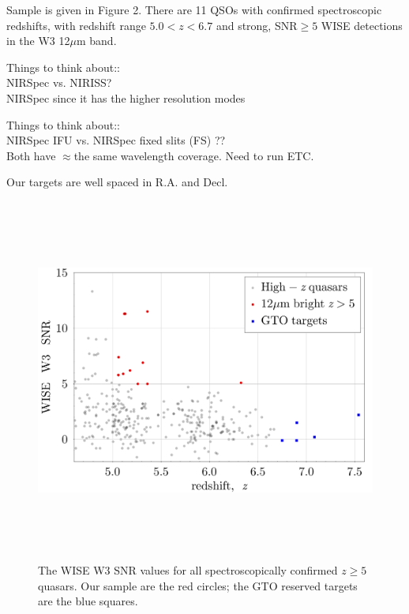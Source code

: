 \smallskip
\smallskip
\noindent
Sample is given in Figure 2. There are 
11 QSOs with confirmed spectroscopic redshifts, with redshift range $5.0<z<6.7$ and
strong, SNR$\geq 5$ WISE detections in the W3 12$\mu$m band.

\smallskip
\smallskip
\noindent
Things to think about::\\
NIRSpec vs. NIRISS?\\
NIRSpec since it has the higher resolution modes

\smallskip
\smallskip
\noindent
Things to think about::\\
NIRSpec IFU vs.  NIRSpec fixed slits (FS) ?? \\
Both have $\approx$the same wavelength coverage. Need to run ETC. 


\smallskip
\smallskip
\noindent
Our targets are well spaced in R.A. and Decl.


\hspace{-7.5cm}
\begin{figure}[h]
  \begin{center}
    \hspace{-0.5cm}
    \includegraphics[height=12.0cm,width=16.0cm]{../Figures/VHzQ_WISE_W3SNR_vs_redshift.png}
    \vspace{-10pt}
\caption{The WISE W3 SNR values for all spectroscopically confirmed $z\geq5$ quasars. 
Our sample are the red circles; the GTO reserved targets are the blue squares.}
    \label{figtest-fig}
  \end{center}
\end{figure}




